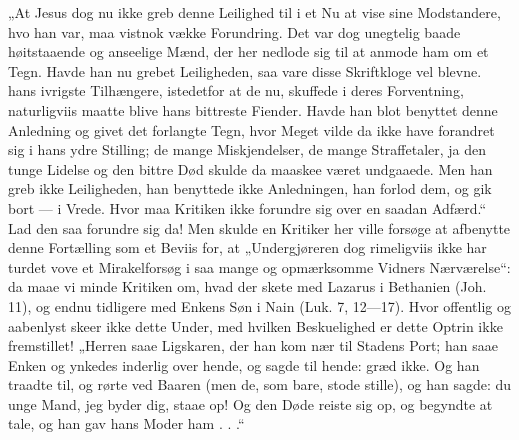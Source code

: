 \documentclass[12pt,a4paper]{book}
\begin{document}
„At Jesus dog nu ikke greb denne Leilighed til i et Nu at vise sine Modstandere, hvo
han var, maa vistnok vække Forundring. Det var dog unegtelig baade høitstaaende og
anseelige Mænd, der her nedlode sig til at anmode ham om et Tegn. Havde han nu grebet
Leiligheden, saa vare disse Skriftkloge vel blevne. hans ivrigste Tilhængere,
istedetfor at de nu, skuffede i deres Forventning, naturligviis maatte blive hans
bittreste Fiender. Havde han blot benyttet denne Anledning og givet det forlangte Tegn,
hvor Meget vilde da ikke have forandret sig i hans ydre Stilling;
de mange Miskjendelser, de mange Straffetaler, ja den tunge Lidelse og den bittre Død
skulde da maaskee været undgaaede. Men han greb ikke Leiligheden, han benyttede ikke
Anledningen, han forlod dem, og gik bort --- i Vrede. Hvor maa Kritiken ikke forundre
sig over en saadan Adfærd.“ Lad den saa forundre sig da! Men skulde en Kritiker her
ville forsøge at afbenytte denne Fortælling som et Beviis for, at „Undergjøreren dog
rimeligviis ikke har turdet vove et Mirakelforsøg i saa mange og opmærksomme Vidners
Nærværelse“: da maae vi minde Kritiken om, hvad der skete med Lazarus i Bethanien (Joh.
11), og endnu tidligere med Enkens Søn i Nain (Luk. 7, 12---17). Hvor offentlig og
aabenlyst skeer ikke dette Under, med hvilken Beskuelighed er dette Optrin ikke
fremstillet! „Herren saae Ligskaren, der han kom nær til Stadens Port; han saae Enken
og ynkedes inderlig over hende, og sagde til hende: græd ikke. Og han traadte til, og
rørte ved Baaren (men de, som bare, stode stille), og han sagde: du unge Mand, jeg
byder dig, staae op! Og den Døde reiste sig op, og begyndte at tale, og han gav hans
Moder ham . . .“
\end{document}
